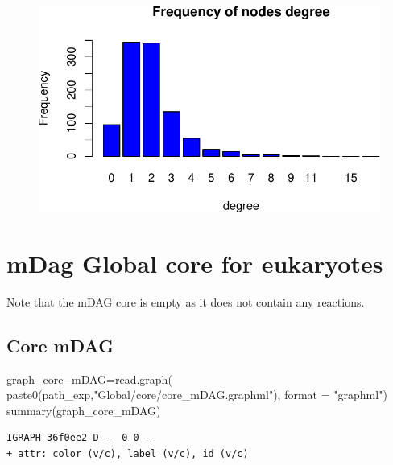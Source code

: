 \documentclass[
  letterpaper,
  DIV=11,
  numbers=noendperiod]{scrreprt}
\newenvironment{Shaded}{}{}
\newcommand{\AttributeTok}[1]{\textcolor[rgb]{0.78,0.47,0.87}{#1}}
\newcommand{\FunctionTok}[1]{\textcolor[rgb]{0.38,0.69,0.94}{#1}}
\newcommand{\NormalTok}[1]{\textcolor[rgb]{0.67,0.70,0.75}{#1}}
\newcommand{\OtherTok}[1]{\textcolor[rgb]{0.15,0.68,0.38}{#1}}
\newcommand{\StringTok}[1]{\textcolor[rgb]{0.60,0.76,0.47}{#1}}
\begin{document}
\begin{figure}[H]

{\centering \includegraphics[width=1\textwidth,height=\textheight]{index_files/figure-pdf/unnamed-chunk-15-1.pdf}

}

\end{figure}

\hypertarget{mdag-global-core-for-eukaryotes}{%
\section{mDag Global core for
eukaryotes}\label{mdag-global-core-for-eukaryotes}}

Note that the mDAG core is empty as it does not contain any reactions.

\hypertarget{core-mdag}{%
\subsection{Core mDAG}\label{core-mdag}}

\begin{Shaded}
\begin{Highlighting}[]
\NormalTok{graph\_core\_mDAG}\OtherTok{=}\FunctionTok{read.graph}\NormalTok{(}
  \FunctionTok{paste0}\NormalTok{(path\_exp,}\StringTok{"Global/core/core\_mDAG.graphml"}\NormalTok{),}
  \AttributeTok{format =} \StringTok{"graphml"}\NormalTok{)}
\FunctionTok{summary}\NormalTok{(graph\_core\_mDAG)}
\end{Highlighting}
\end{Shaded}

\begin{verbatim}
IGRAPH 36f0ee2 D--- 0 0 -- 
+ attr: color (v/c), label (v/c), id (v/c)
\end{verbatim}
\end{document}
